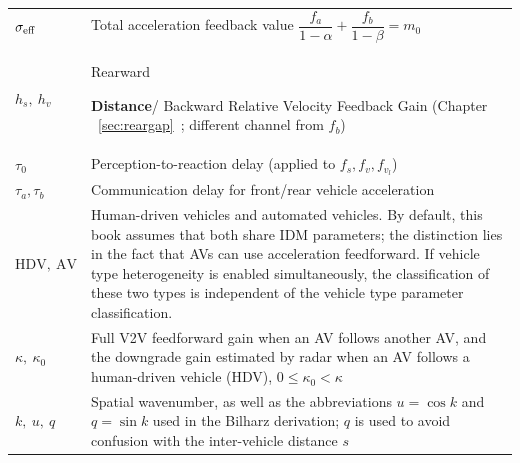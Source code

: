 \documentclass[11pt,a4paper,openany]{book}
\numberwithin{equation}{chapter}
\numberwithin{figure}{chapter}
\numberwithin{table}{chapter}
\begin{document}
\begin{center}
\begin{tabular}{p{2.4cm}p{11.4cm}}
\\
$\sigma_{\rm eff}$ &




 Total acceleration feedback value $\dfrac{f_a}{1-\alpha}+\dfrac{f_b}{1-\beta}=m_0$



\\
$h_s,\ h_v$ &




Rearward




\textbf{Distance}/ Backward Relative Velocity Feedback Gain (Chapter ~\ref{sec:reargap}~; different channel from $f_b$)



\\
\midrule
$\tau_0$ &




 Perception-to-reaction delay (applied to $f_s,f_v,f_{v_l}$)



\\
$\tau_a,\tau_b$ &




 Communication delay for front/rear vehicle acceleration



\\
\midrule
$\mathrm{HDV},\ \mathrm{AV}$ &




 Human-driven vehicles and automated vehicles. By default, this book assumes that both share IDM parameters; the distinction lies in the fact that AVs can use acceleration feedforward. If vehicle type heterogeneity is enabled simultaneously, the classification of these two types is independent of the vehicle type parameter classification.



\\
$\kappa,\ \kappa_0$ &




 Full V2V feedforward gain when an AV follows another AV, and the downgrade gain estimated by radar when an AV follows a human-driven vehicle (HDV), $0\le\kappa_0<\kappa$



\\
\midrule
$k,\ u,\ q$ &




 Spatial wavenumber, as well as the abbreviations $u=\cos k$ and $q=\sin k$ used in the Bilharz derivation; $q$ is used to avoid confusion with the inter-vehicle distance $s$




\end{tabular}
\end{center}
\end{document}
